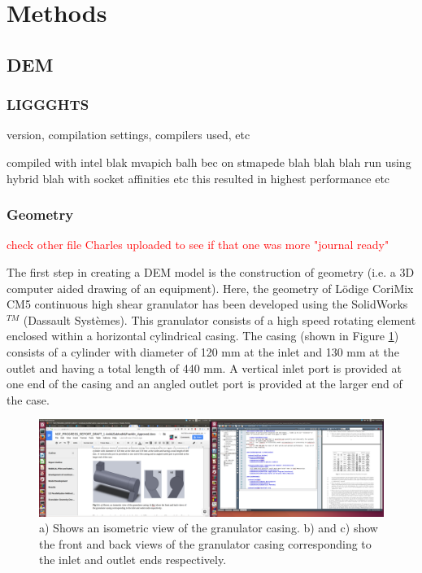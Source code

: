 \documentclass[preprint,11pt,authoryear]{elsarticle}
\begin{document}
\section{Methods}

  \subsection{DEM}
    \subsubsection{LIGGGHTS}
    \par version, compilation settings, compilers used, etc
    \par compiled with intel blak mvapich balh bec on stmapede blah blah blah run using hybrid blah with socket affinities etc this resulted in highest performance etc 
        
    \subsubsection{Geometry}    
    \par \textcolor{red}{check other file Charles uploaded to see if that one was more "journal ready"}
    
    \par The first step in creating a DEM model is the construction of geometry (i.e. a 3D computer aided drawing of an equipment). Here, the geometry of L\"{o}dige CoriMix CM5 continuous high shear granulator has been developed using the SolidWorks$^{TM}$ (Dassault Syst\`{e}mes). This granulator consists of a high speed rotating element enclosed within a horizontal cylindrical casing. The casing (shown in Figure \ref{fig:mthdsDemCharlesGranShell}) consists of a cylinder with diameter of 120 mm at the inlet and 130 mm at the outlet and having a total length of 440 mm. A vertical inlet port is provided at one end of the casing and an angled outlet port is provided at the larger end of the case. 

      \begin{figure}[H]
      \centering
      \includegraphics[scale=0.1]{mthds_dem_charles_fig5pt01_gran_shell}
      \caption{ a) Shows an isometric view of the granulator casing. b) and c) show the front and back views of the granulator casing corresponding to the inlet and outlet ends respectively.}
      \label{fig:mthdsDemCharlesGranShell}
      \end{figure}
   
\end{document}
